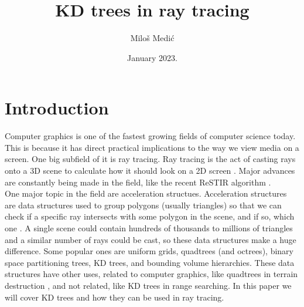 \documentclass[12pt]{article}
\title{KD trees in ray tracing}
\author{Miloš Medić}
\date{January 2023.}
\begin{document}
\maketitle
\thispagestyle{empty}

\newpage
\tableofcontents
\thispagestyle{empty}

\clearpage
{}
\section{Introduction}
Computer graphics is one of the fastest growing fields of computer science today. This is because it has direct practical implications to the way we view media on a screen. One big subfield of it is ray tracing. Ray tracing is the act of casting rays onto a 3D scene to calculate how it should look on a 2D screen \cite{glassner1989introduction}. Major advances are constantly being made in the field, like the recent ReSTIR algorithm \cite{ouyang2021restir}. \\
\indent One major topic in the field are acceleration structues. Acceleration structures are data structures used to group polygons (usually triangles) so that we can check if a specific ray intersects with some polygon in the scene, and if so, which one \cite{glassner1989introduction}. A single scene could contain hundreds of thousands to millions of triangles and a similar number of rays could be cast, so these data structures make a huge difference. Some popular ones are uniform grids, quadtrees (and octrees), binary space partitioning trees, KD trees, and bounding volume hierarchies. These data structures have other uses, related to computer graphics, like quadtrees in terrain destruction \cite{nassen2019real}, and not related, like KD trees in range searching. In this paper we will cover KD trees and how they can be used in ray tracing.
\end{document}
